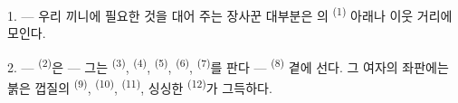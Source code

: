 %
%
%
%
%

\VUsaut{4.0mm}
\VUsaut{3.0mm}

\VUsaut{3.0mm}

1. --- 우리 끼니에 필요한 것을 대어 주는 장사꾼 대부분은 의
 \textsuperscript{(1)} 아래나 이웃 거리에 모인다.

2. ---  \textsuperscript{(2)}은 — 그는 
\textsuperscript{(3)},  \textsuperscript{(4)}, 
\textsuperscript{(5)},  \textsuperscript{(6)}, 
\textsuperscript{(7)}를 판다 —  \textsuperscript{(8)} 곁에
선다. 그 여자의 좌판에는 붉은 껍질의  \textsuperscript{(9)},
 \textsuperscript{(10)},  \textsuperscript{(11)},
싱싱한  \textsuperscript{(12)}가 그득하다.

